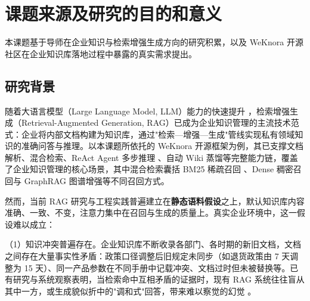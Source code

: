 \section{课题来源及研究的目的和意义}

本课题基于导师在企业知识与检索增强生成方向的研究积累，以及 WeKnora 开源社区在企业知识库落地过程中暴露的真实需求提出。

\subsection{研究背景}

随着大语言模型（Large Language Model, LLM）能力的快速提升 \cite{che2023}，检索增强生成（Retrieval-Augmented Generation, RAG）已成为企业知识管理的主流技术范式：企业将内部文档构建为知识库，通过"检索—增强—生成"管线实现私有领域知识的准确问答与推理。以本课题所依托的 WeKnora 开源框架为例，其已支撑文档解析、混合检索、ReAct Agent 多步推理 \cite{yao2023}、自动 Wiki 蒸馏等完整能力链，覆盖了企业知识管理的核心场景，其中混合检索囊括 BM25 稀疏召回 \cite{robertson2009}、Dense 稠密召回与 GraphRAG 图谱增强等不同召回方式。

然而，当前 RAG 研究与工程实践普遍建立在\textbf{静态语料假设}之上，默认知识库内容准确、一致、不变，注意力集中在召回与生成的质量上。真实企业环境中，这一假设难以成立：

（1）知识冲突普遍存在。企业知识库不断收录各部门、各时期的新旧文档，文档之间存在大量事实性矛盾：政策口径调整后旧规定未同步（如退货政策由 7 天调整为 15 天）、同一产品参数在不同手册中记载冲突、文档过时但未被替换等。已有研究与系统观察表明，当检索命中互相矛盾的证据时，现有 RAG 系统往往盲从其中一方，或生成貌似折中的"调和式"回答，带来难以察觉的幻觉 \cite{liu2025halluc}。

